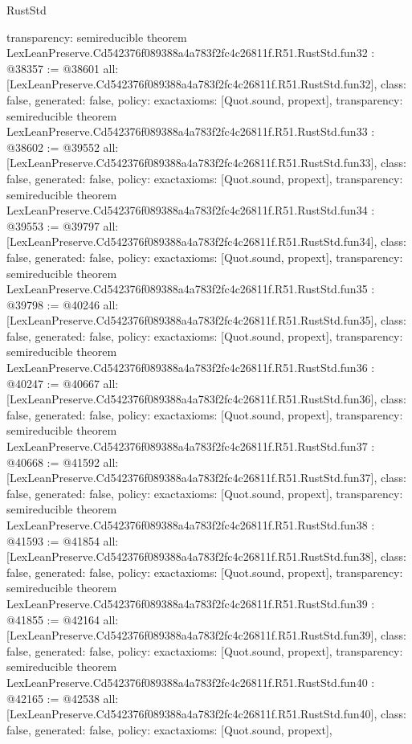 \begin{lexlean}{RustStd}
\begin{coremodule}
{  transparency: semireducible
}
theorem LexLeanPreserve.Cd542376f089388a4a783f2fc4c26811f.R51.RustStd.fun32 : @38357 := @38601 {
  all: [LexLeanPreserve.Cd542376f089388a4a783f2fc4c26811f.R51.RustStd.fun32],
  class: false,
  generated: false,
  policy: exact{axioms: [Quot.sound, propext]},
  transparency: semireducible
}
theorem LexLeanPreserve.Cd542376f089388a4a783f2fc4c26811f.R51.RustStd.fun33 : @38602 := @39552 {
  all: [LexLeanPreserve.Cd542376f089388a4a783f2fc4c26811f.R51.RustStd.fun33],
  class: false,
  generated: false,
  policy: exact{axioms: [Quot.sound, propext]},
  transparency: semireducible
}
theorem LexLeanPreserve.Cd542376f089388a4a783f2fc4c26811f.R51.RustStd.fun34 : @39553 := @39797 {
  all: [LexLeanPreserve.Cd542376f089388a4a783f2fc4c26811f.R51.RustStd.fun34],
  class: false,
  generated: false,
  policy: exact{axioms: [Quot.sound, propext]},
  transparency: semireducible
}
theorem LexLeanPreserve.Cd542376f089388a4a783f2fc4c26811f.R51.RustStd.fun35 : @39798 := @40246 {
  all: [LexLeanPreserve.Cd542376f089388a4a783f2fc4c26811f.R51.RustStd.fun35],
  class: false,
  generated: false,
  policy: exact{axioms: [Quot.sound, propext]},
  transparency: semireducible
}
theorem LexLeanPreserve.Cd542376f089388a4a783f2fc4c26811f.R51.RustStd.fun36 : @40247 := @40667 {
  all: [LexLeanPreserve.Cd542376f089388a4a783f2fc4c26811f.R51.RustStd.fun36],
  class: false,
  generated: false,
  policy: exact{axioms: [Quot.sound, propext]},
  transparency: semireducible
}
theorem LexLeanPreserve.Cd542376f089388a4a783f2fc4c26811f.R51.RustStd.fun37 : @40668 := @41592 {
  all: [LexLeanPreserve.Cd542376f089388a4a783f2fc4c26811f.R51.RustStd.fun37],
  class: false,
  generated: false,
  policy: exact{axioms: [Quot.sound, propext]},
  transparency: semireducible
}
theorem LexLeanPreserve.Cd542376f089388a4a783f2fc4c26811f.R51.RustStd.fun38 : @41593 := @41854 {
  all: [LexLeanPreserve.Cd542376f089388a4a783f2fc4c26811f.R51.RustStd.fun38],
  class: false,
  generated: false,
  policy: exact{axioms: [Quot.sound, propext]},
  transparency: semireducible
}
theorem LexLeanPreserve.Cd542376f089388a4a783f2fc4c26811f.R51.RustStd.fun39 : @41855 := @42164 {
  all: [LexLeanPreserve.Cd542376f089388a4a783f2fc4c26811f.R51.RustStd.fun39],
  class: false,
  generated: false,
  policy: exact{axioms: [Quot.sound, propext]},
  transparency: semireducible
}
theorem LexLeanPreserve.Cd542376f089388a4a783f2fc4c26811f.R51.RustStd.fun40 : @42165 := @42538 {
  all: [LexLeanPreserve.Cd542376f089388a4a783f2fc4c26811f.R51.RustStd.fun40],
  class: false,
  generated: false,
  policy: exact{axioms: [Quot.sound, propext]},
}
\end{coremodule}
\end{lexlean}
